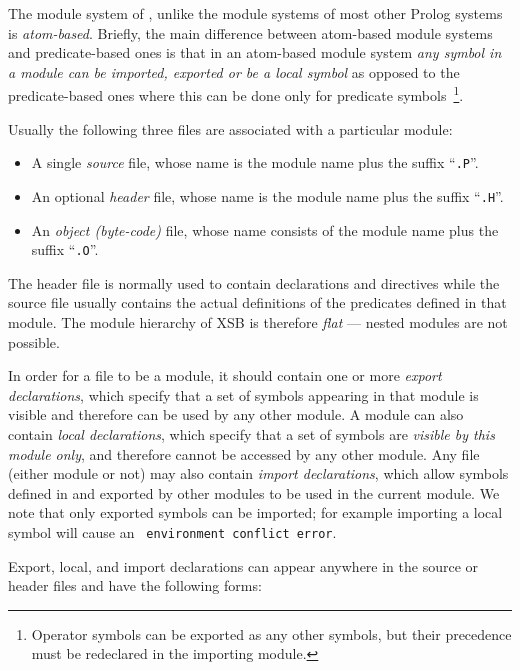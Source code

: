 The module system of \ourprolog, unlike the module systems of most
other Prolog systems is {\em atom-based}.  Briefly, the main
difference between atom-based module systems and predicate-based ones
is that in an atom-based module system {\em any symbol in a module can
be imported, exported or be a local symbol} as opposed to the
predicate-based ones where this can be done only for predicate
symbols~\footnote{Operator symbols can be exported as any other
symbols, but their precedence must be redeclared in the importing
module.}.

Usually the following three files are associated with a particular
module:
\begin{itemize}
\item A single {\it source} file, whose name is the module name plus 
      the suffix ``{\tt .P}''.  
\item An optional {\it header} file, whose name is the module name plus 
      the suffix ``{\tt .H}''.  
\item An {\it object (byte-code)} file, whose name consists of the module 
      name plus the suffix ``{\tt .O}''.
\end{itemize}
The header file is normally used to contain declarations and
directives while the source file usually contains the actual
definitions of the predicates defined in that module.  The module
hierarchy of XSB is therefore {\em flat} --- nested modules are not
possible.

In order for a file to be a module, it should contain one or more 
{\it export declarations}, which specify that a set of symbols appearing
in that module is visible and therefore can be used by any other module.
A module can also contain {\it local declarations}, which specify that
a set of symbols are {\it visible by this module only}, and therefore
cannot be accessed by any other module.
Any file (either module or not) may also contain {\it import declarations},
which allow symbols defined in and exported by other modules to be used
in the current module.  We note that only exported symbols can be
imported; for example importing a local symbol will cause an {\tt
environment conflict error}.

Export, local, and import declarations can appear anywhere in the source
or header files and have the following forms:




